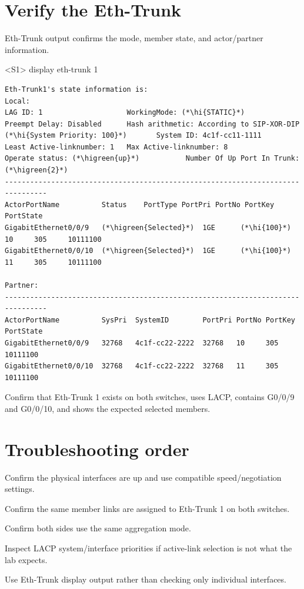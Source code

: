 \section{Verify the Eth-Trunk}
Eth-Trunk output confirms the mode, member state, and actor/partner information.

\begin{vrpbox}{<S1> display eth-trunk 1}
\begin{lstlisting}[style=vrp]
Eth-Trunk1's state information is:
Local:
LAG ID: 1                    WorkingMode: (*\hi{STATIC}*)
Preempt Delay: Disabled      Hash arithmetic: According to SIP-XOR-DIP
(*\hi{System Priority: 100}*)       System ID: 4c1f-cc11-1111
Least Active-linknumber: 1   Max Active-linknumber: 8
Operate status: (*\higreen{up}*)           Number Of Up Port In Trunk: (*\higreen{2}*)
--------------------------------------------------------------------------------
ActorPortName          Status    PortType PortPri PortNo PortKey PortState
GigabitEthernet0/0/9   (*\higreen{Selected}*)  1GE      (*\hi{100}*)     10     305     10111100
GigabitEthernet0/0/10  (*\higreen{Selected}*)  1GE      (*\hi{100}*)     11     305     10111100

Partner:
--------------------------------------------------------------------------------
ActorPortName          SysPri  SystemID        PortPri PortNo PortKey PortState
GigabitEthernet0/0/9   32768   4c1f-cc22-2222  32768   10     305     10111100
GigabitEthernet0/0/10  32768   4c1f-cc22-2222  32768   11     305     10111100
\end{lstlisting}
\end{vrpbox}

\begin{verification}
Confirm that Eth-Trunk 1 exists on both switches, uses LACP, contains G0/0/9 and G0/0/10, and shows the expected selected members.
\end{verification}

\section{Troubleshooting order}
\begin{utpsteps}
\item Confirm the physical interfaces are up and use compatible speed/negotiation settings.
\item Confirm the same member links are assigned to Eth-Trunk 1 on both switches.
\item Confirm both sides use the same aggregation mode.
\item Inspect LACP system/interface priorities if active-link selection is not what the lab expects.
\item Use Eth-Trunk display output rather than checking only individual interfaces.
\end{utpsteps}

